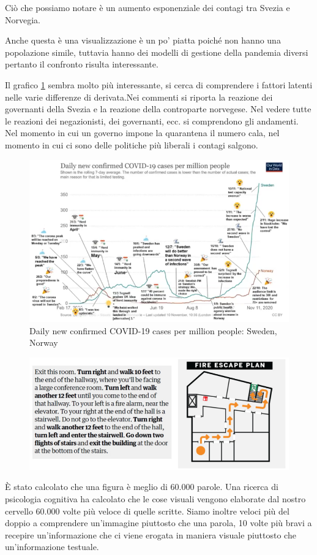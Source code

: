 \documentclass[12pt,a4paper]{report}
\begin{document}
Ciò che possiamo notare è un aumento esponenziale dei contagi tra Svezia e Norvegia.

Anche questa è una visualizzazione è un po' piatta poiché non hanno una popolazione simile, tuttavia hanno dei modelli di gestione della pandemia diversi pertanto il confronto risulta interessante. 

Il grafico \ref{fig:contagi4} sembra molto più interessante, si cerca di comprendere i fattori latenti nelle varie differenze di derivata.Nei commenti si riporta la reazione dei governanti della Svezia e la reazione della controparte norvegese. Nel vedere tutte le reazioni dei negazionisti, dei governanti, ecc. si comprendono gli andamenti. Nel momento in cui un governo impone la quarantena il numero cala, nel momento in cui ci sono delle politiche più liberali i contagi salgono.

\begin{figure} [h]
	\centering
	\includegraphics[width=0.6\linewidth]{imgs datavis/Covid3.png}
	\caption{Daily new confirmed COVID-19 cases per million people: Sweden, Norway}
	\label{fig:contagi4}
\end{figure} 


\begin{figure} [h]
	\centering
	\includegraphics[width=0.6\linewidth]{imgs datavis/esperimento.png}
	\caption{}
	\label{fig:esperimento}
\end{figure} 

\`E stato calcolato che una figura è meglio di 60.000 parole. Una ricerca di psicologia cognitiva ha calcolato che le cose visuali vengono elaborate dal nostro cervello 60.000 volte più veloce di quelle scritte. Siamo inoltre veloci più del doppio a comprendere un'immagine piuttosto che una parola, 10 volte più bravi a recepire un'informazione che ci viene erogata in maniera visuale piuttosto che un'informazione testuale. 
\end{document}
